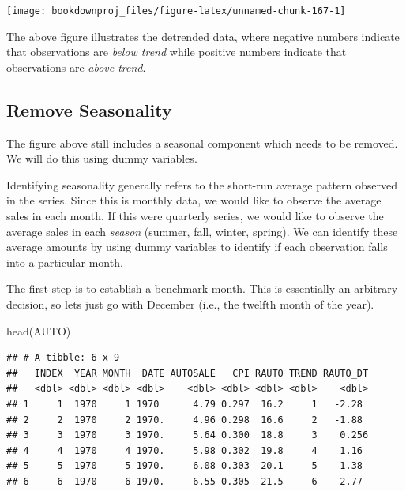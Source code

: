 \documentclass[
]{book}
\newenvironment{Shaded}{\begin{snugshade}}{\end{snugshade}}
\newcommand{\FunctionTok}[1]{\textcolor[rgb]{0.00,0.00,0.00}{#1}}
\newcommand{\NormalTok}[1]{#1}
\begin{document}
\begin{center}\texttt{[image: bookdownproj\_files/figure-latex/unnamed-chunk-167-1]} \end{center}

The above figure illustrates the detrended data, where negative numbers indicate that observations are \emph{below trend} while positive numbers indicate that observations are \emph{above trend}.

\hypertarget{remove-seasonality}{%
\subsection*{Remove Seasonality}\label{remove-seasonality}}

The figure above still includes a seasonal component which needs to be removed. We will do this using dummy variables.

Identifying seasonality generally refers to the short-run average pattern observed in the series. Since this is monthly data, we would like to observe the average sales in each month. If this were quarterly series, we would like to observe the average sales in each \emph{season} (summer, fall, winter, spring). We can identify these average amounts by using dummy variables to identify if each observation falls into a particular month.

The first step is to establish a benchmark month. This is essentially an arbitrary decision, so lets just go with December (i.e., the twelfth month of the year).

\begin{Shaded}
\begin{Highlighting}[]
\FunctionTok{head}\NormalTok{(AUTO)}
\end{Highlighting}
\end{Shaded}

\begin{verbatim}
## # A tibble: 6 x 9
##   INDEX  YEAR MONTH  DATE AUTOSALE   CPI RAUTO TREND RAUTO_DT
##   <dbl> <dbl> <dbl> <dbl>    <dbl> <dbl> <dbl> <dbl>    <dbl>
## 1     1  1970     1 1970      4.79 0.297  16.2     1   -2.28 
## 2     2  1970     2 1970.     4.96 0.298  16.6     2   -1.88 
## 3     3  1970     3 1970.     5.64 0.300  18.8     3    0.256
## 4     4  1970     4 1970.     5.98 0.302  19.8     4    1.16 
## 5     5  1970     5 1970.     6.08 0.303  20.1     5    1.38 
## 6     6  1970     6 1970.     6.55 0.305  21.5     6    2.77
\end{verbatim}
\end{document}
